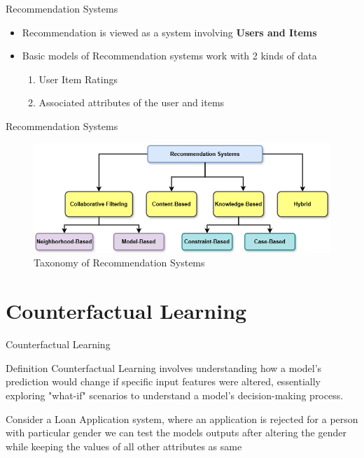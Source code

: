 \documentclass[aspectratio=169,xcolor=dvipsnames]{beamer}
\begin{document}
	\begin{frame}{Recommendation Systems}
		\begin{itemize}
			\item Recommendation is viewed as a system involving  \textbf{Users and Items}
			\item Basic models of Recommendation systems work with 2 kinds of data 
			\begin{enumerate}
				\item User Item Ratings
				\item Associated attributes of the user and items \cite{recsysbook}
			\end{enumerate}			 
		\end{itemize}
	\end{frame}
	\begin{frame}{Recommendation Systems}
		\begin{figure}
		\includegraphics[width=0.8\linewidth]{recommendation systems taxanomy.png}
		\caption{Taxonomy of Recommendation Systems}
		\end{figure}
	\end{frame}
	
	
	\section{Counterfactual Learning}
	\begin{frame}{Counterfactual Learning}
		\begin{block}{Definition}
			Counterfactual Learning involves understanding how a model's prediction would change if specific input features were altered, essentially exploring "what-if" scenarios to understand a model's decision-making process. 
		\end{block}
		\begin{example}
			Consider a Loan Application system, where an application is rejected for a person with particular gender we can test the models outputs after altering the gender while keeping the values of all other attributes as same
		\end{example}
	\end{frame}
	
\end{document}
